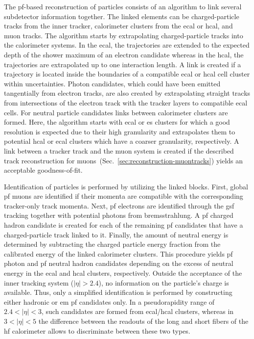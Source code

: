 The \gls{pf}-based reconstruction of particles consists of an algorithm to link several subdetector information together. The linked elements can be charged-particle tracks from the inner tracker, calorimeter clusters from the \gls{ecal} or \gls{hcal}, and muon tracks. The algorithm starts by extrapolating charged-particle tracks into the calorimeter systems. In the \gls{ecal}, the trajectories are extended to the expected depth of the shower maximum of an electron candidate whereas in the \gls{hcal}, the trajectories are extrapolated up to one interaction length. A link is created if a trajectory is located inside the boundaries of a compatible \gls{ecal} or \gls{hcal} cell cluster within uncertainties. Photon candidates, which could have been emitted tangentially from electron tracks, are also created by extrapolating straight tracks from intersections of the electron track with the tracker layers to compatible \gls{ecal} cells. For neutral particle candidates links between calorimeter clusters are formed. Here, the algorithm starts with \gls{ecal} or \gls{es} clusters for which a good resolution is expected due to their high granularity and extrapolates them to potential \gls{hcal} or \gls{ecal} clusters which have a coarser granularity, respectively. A link between a tracker track and the muon system is created if the described track reconstruction for muons~(Sec.~\ref{sec:reconstruction-muontracks}) yields an acceptable goodness-of-fit.

Identification of particles is performed by utilizing the linked blocks. First, global \gls{pf} muons are identified if their momenta are compatible with the corresponding tracker-only track momenta. Next, \gls{pf} electrons are identified through the \gls{gsf} tracking together with potential photons from bremsstrahlung. A \gls{pf} charged hadron candidate is created for each of the remaining \gls{pf} candidates that have a charged-particle track linked to it. Finally, the amount of neutral energy is determined by subtracting the charged particle energy fraction from the calibrated energy of the linked calorimeter clusters. This procedure yields \gls{pf} photon and \gls{pf} neutral hadron candidates depending on the excess of neutral energy in the \gls{ecal} and \gls{hcal} clusters, respectively. Outside the acceptance of the inner tracking system ($|\eta|>2.4$), no information on the particle's charge is available. Thus, only a simplified identification is performed by constructing either hadronic or \gls{em} \gls{pf} candidates only. In a pseudorapidity range of $2.4<|\eta|<3$, such candidates are formed from \gls{ecal}/\gls{hcal} clusters, whereas in $3<|\eta|<5$ the difference between the readouts of the long and short fibers of the \gls{hf} calorimeter allows to discriminate between these two types.

